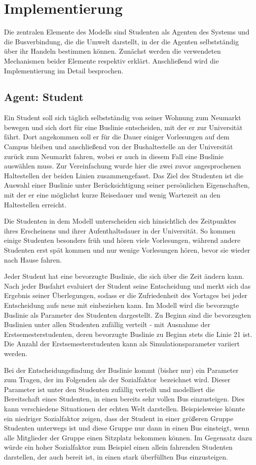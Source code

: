 \documentclass[12pt,a4paper]{scrartcl}
\begin{document}
\section{Implementierung}\label{impl}
Die zentralen Elemente des Modells sind Studenten als Agenten des Systems und die Busverbindung, die die Umwelt darstellt, in der die Agenten selbstständig über ihr Handeln bestimmen können. Zunächst werden die verwendeten Mechanismen beider Elemente respektiv erklärt. Anschließend wird die Implementierung im Detail besprochen.

\subsection{Agent: Student}\label{agent}
Ein Student soll sich täglich selbstständig von seiner Wohnung zum Neumarkt bewegen und sich dort für eine Buslinie entscheiden, mit der er zur Universität fährt. Dort angekommen soll er für die Dauer einiger Vorlesungen auf dem Campus bleiben und anschließend von der Bushaltestelle an der Universität zurück zum Neumarkt fahren, wobei er auch in diesem Fall eine Buslinie auswählen muss. Zur Vereinfachung wurde hier die zwei zuvor angesprochenen Haltestellen der beiden Linien zusammengefasst. 
Das Ziel des Studenten ist die Auswahl einer Buslinie unter Berücksichtigung seiner persönlichen Eigenschaften, mit der er eine möglichst kurze Reisedauer und wenig Wartezeit an den Haltestellen erreicht.

Die Studenten in dem Modell unterscheiden sich hinsichtlich des Zeitpunktes ihres Erscheinens und ihrer Aufenthaltsdauer in der Universität. So kommen einige Studenten besonders früh und hören viele Vorlesungen, während andere Studenten erst spät kommen und nur wenige Vorlesungen hören, bevor sie wieder nach Hause fahren.

Jeder Student hat eine bevorzugte Buslinie, die sich über die Zeit ändern kann. Nach jeder Busfahrt evaluiert der Student seine Entscheidung und merkt sich das Ergebnis seiner Überlegungen, sodass er die Zufriedenheit des Vortages bei jeder Entscheidung aufs neue mit einbeziehen kann. Im Modell wird die bevorzugte Buslinie als Parameter des Studenten dargestellt. Zu Beginn sind die bevorzugten Buslinien unter allen Studenten zufällig verteilt - mit Ausnahme der Erstsemesterstudenten, deren bevorzugte Buslinie zu Beginn stets die Linie 21 ist. Die Anzahl der Erstsemesterstudenten kann als Simulationsparameter variiert werden.

Bei der Entscheidungsfindung der Buslinie kommt (bisher nur) ein Parameter zum Tragen, der im Folgenden als der \glqq Sozialfaktor\grqq~bezeichnet wird. Dieser Parameter ist unter den Studenten zufällig verteilt und modelliert die Bereitschaft eines Studenten, in einen bereits sehr vollen Bus einzusteigen. Dies kann verschiedene Situationen der echten Welt darstellen. Beispielsweise könnte ein niedriger Sozialfaktor zeigen, dass der Student in einer größeren Gruppe Studenten unterwegs ist und diese Gruppe nur dann in einen Bus einsteigt, wenn alle Mitglieder der Gruppe einen Sitzplatz bekommen können. Im Gegensatz dazu würde ein hoher Sozialfaktor zum Beispiel einen allein fahrenden Studenten darstellen, der auch bereit ist, in einen stark überfüllten Bus einzusteigen.
\end{document}
